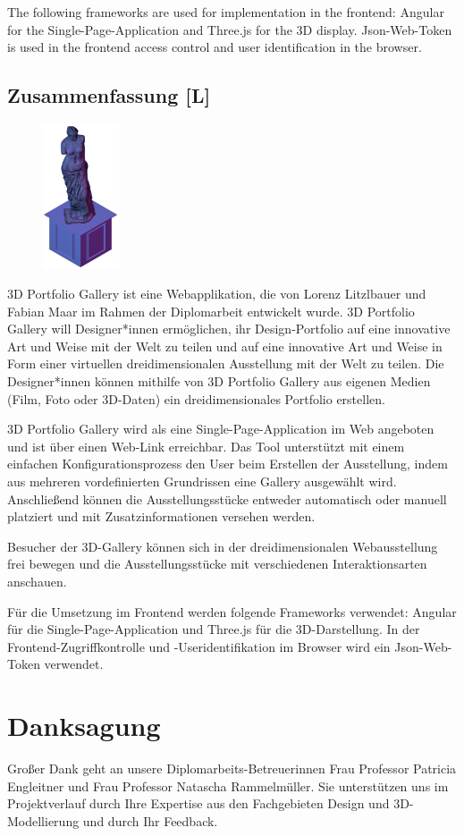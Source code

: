 The following frameworks are used for implementation in the frontend: Angular for the Single-Page-Application and Three.js for the 3D display. Json-Web-Token is used in the frontend access control and user identification in the browser.
\newpage
\begin{spacing}{1}
    \chapter*{Zusammenfassung [L]}
\end{spacing}
\begin{figure}
    \begin{center}
      \includegraphics[width=0.2\textwidth]{pics/statue.png}
    \end{center}
\end{figure}
3D Portfolio Gallery ist eine Webapplikation, die von Lorenz Litzlbauer und Fabian Maar im Rahmen der Diplomarbeit entwickelt wurde. 3D Portfolio Gallery will Designer*innen ermöglichen, ihr Design-Portfolio auf eine innovative Art und Weise mit der Welt zu teilen und auf eine innovative Art und Weise in Form einer virtuellen dreidimensionalen Ausstellung mit der Welt zu teilen. Die Designer*innen können mithilfe von 3D Portfolio Gallery aus eigenen Medien (Film, Foto oder 3D-Daten) ein dreidimensionales Portfolio erstellen.

3D Portfolio Gallery wird als eine Single-Page-Application im Web angeboten und ist über einen Web-Link erreichbar. Das Tool unterstützt mit einem einfachen Konfigurationsprozess den User beim Erstellen der Ausstellung, indem aus mehreren vordefinierten Grundrissen eine Gallery ausgewählt wird. Anschließend können die Ausstellungsstücke entweder automatisch oder manuell platziert und mit Zusatzinformationen versehen werden.

Besucher der 3D-Gallery können sich in der dreidimensionalen Webausstellung frei bewegen und die Ausstellungsstücke mit verschiedenen Interaktionsarten anschauen.

Für die Umsetzung im Frontend werden folgende Frameworks verwendet: Angular für die Single-Page-Application und Three.js für die 3D-Darstellung. In der Frontend-Zugriffkontrolle und -Useridentifikation im Browser wird ein Json-Web-Token verwendet.

\chapter*{Danksagung}
Großer Dank geht an unsere Diplomarbeits-Betreuerinnen
Frau Professor Patricia Engleitner und Frau Professor Natascha Rammelmüller. Sie unterstützen uns im Projektverlauf durch Ihre Expertise aus den Fachgebieten Design und 3D-Modellierung und durch Ihr Feedback.
